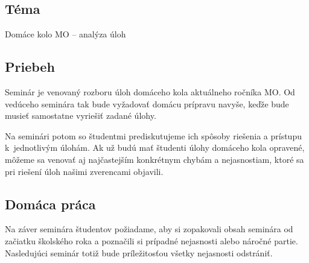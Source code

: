 

\subsection*{Téma}
Domáce kolo MO -- analýza úloh

\subsection*{Priebeh}
Seminár je venovaný rozboru úloh domáceho kola aktuálneho ročníka MO. Od vedúceho seminára tak bude vyžadovať domácu prípravu navyše, keďže bude musieť samostatne vyriešiť zadané úlohy.

Na seminári potom so študentmi prediskutujeme ich spôsoby riešenia a prístupu k~jednotlivým úlohám. Ak už budú mať študenti úlohy domáceho kola opravené, môžeme sa venovať aj najčastejším konkrétnym chybám a nejasnostiam, ktoré sa pri riešení úloh našimi zverencami objavili.

\subsection*{Domáca práca}
Na záver seminára študentov požiadame, aby si zopakovali obsah seminára od začiatku školského roka a poznačili si prípadné nejasnosti alebo náročné partie. Nasledujúci seminár totiž bude príležitosťou všetky nejasnosti odstrániť.



